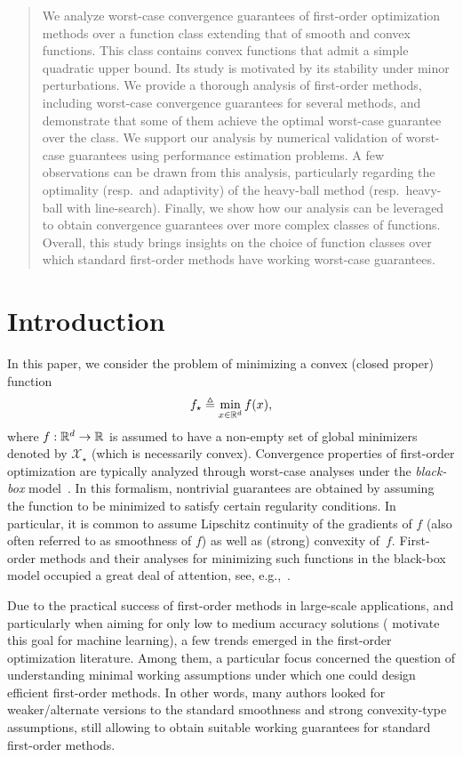 \begin{abstract}
    We analyze worst-case convergence guarantees of first-order optimization methods over a function class extending that of smooth and convex functions.
    This class contains convex functions that admit a simple quadratic upper bound.
    Its study is motivated by its stability under minor perturbations.
    We provide a thorough analysis of first-order methods, including worst-case convergence guarantees for several methods,
    and demonstrate that some of them achieve the optimal worst-case guarantee over the class.
    We support our analysis by numerical validation of worst-case guarantees using performance estimation problems.
    A few observations can be drawn from this analysis, particularly regarding the optimality (resp.~and adaptivity)
    of the heavy-ball method (resp.~heavy-ball with line-search).
    Finally, we show how our analysis can be leveraged to obtain convergence guarantees over more complex classes of functions.
    Overall, this study brings insights on the choice of function classes over which standard first-order methods have working worst-case guarantees.
\end{abstract}


\section{Introduction}\label{sec:introduction}
    In this paper, we consider the problem of minimizing a convex (closed proper) function
    \begin{equation}\label{eq:opt}
    f_{\star}\triangleq\min_{x\in \mathbb{R} ^d} f(x),
    \end{equation}
    where $f: \mathbb{R}^d \to \mathbb{R}$ is assumed to have a non-empty set of global minimizers denoted by $\mathcal{X}_\star$ (which is necessarily convex).
    Convergence properties of first-order optimization are typically analyzed through worst-case analyses under the \emph{black-box} model~\citep{Book:NemirovskyYudin}.
    In this formalism, nontrivial guarantees are obtained by assuming the function to be minimized to satisfy certain regularity conditions.
    In particular, it is common to assume Lipschitz continuity of the gradients of $f$ (also often referred to as smoothness of $f$) as well as (strong) convexity of~$f$.
    First-order methods and their analyses for minimizing such functions in the black-box model occupied a great deal of attention, see, e.g.,~\citep{Book:NemirovskyYudin,Book:polyak1987,Nest03a}.

    Due to the practical success of first-order methods in large-scale applications,
    and particularly when aiming for only low to medium accuracy solutions (\citet{bottou2007tradeoffs} motivate this goal for machine learning),
    a few trends emerged in the first-order optimization literature.
    Among them, a particular focus concerned the question of understanding minimal working assumptions under which one could design efficient first-order methods.
    In other words, many authors looked for weaker/alternate versions to the standard smoothness and strong convexity-type assumptions,
    still allowing to obtain suitable working guarantees for standard first-order methods.

